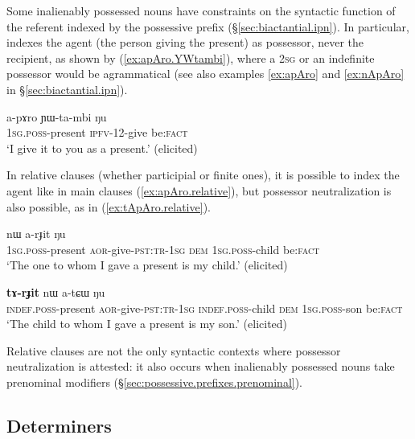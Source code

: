 Some inalienably possessed nouns have constraints on the syntactic function of the referent indexed by the possessive prefix (§\ref{sec:biactantial.ipn}). In particular,  indexes the agent (the person giving the present) as possessor, never the recipient, as shown by (\ref{ex:apAro.YWtambi}), where a \textsc{2sg}  or an indefinite possessor  would be agrammatical (see also examples \ref{ex:apAro} and \ref{ex:nApAro} in §\ref{sec:biactantial.ipn}).
	
\begin{exe}
\ex \label{ex:apAro.YWtambi}
\gll a-pɤro ɲɯ-ta-mbi ŋu \\
\textsc{1sg}.\textsc{poss}-present \textsc{ipfv}-1\fl{}2-give be:\textsc{fact} \\
\glt `I give it to you as a present.' (elicited)
\end{exe} 
	 
In relative clauses (whether participial or finite ones), it is possible to index the agent like in main clauses (\ref{ex:apAro.relative}), but  possessor neutralization is also possible, as in (\ref{ex:tApAro.relative}).

\begin{exe}
\ex \label{ex:apAro.relative}
 nɯ a-rɟit ŋu  \\
	\textsc{1sg}.\textsc{poss}-present \textsc{aor}-give-\textsc{pst}:\textsc{tr}-\textsc{1sg} \textsc{dem} \textsc{1sg}.\textsc{poss}-child be:\textsc{fact} \\
\glt `The one to whom I gave a present is my child.' (elicited)
\end{exe} 

\begin{exe}
\ex \label{ex:tApAro.relative}
 \textbf{tɤ-rɟit} nɯ a-tɕɯ ŋu \\
\textsc{indef}.\textsc{poss}-present \textsc{aor}-give-\textsc{pst}:\textsc{tr}-\textsc{1sg} 	\textsc{indef}.\textsc{poss}-child \textsc{dem} \textsc{1sg}.\textsc{poss}-son be:\textsc{fact} \\
\glt `The child to whom I gave a present is my son.' (elicited)
\end{exe} 

Relative clauses are not the only syntactic contexts where possessor neutralization is attested: it also occurs when inalienably possessed nouns take prenominal modifiers (§\ref{sec:possessive.prefixes.prenominal}).


\subsection{Determiners} \label{sec:relative.determiners}

